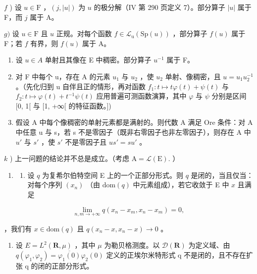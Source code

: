 \(f\) ) 设 \(u\in \mathrm{F}\) ，\((j,|u|)\) 为 \(u\) 的极分解（IV 第 290 页定义 7）。部分算子 \(|u|\) 属于 F，而 \(j\) 属于 A。

\(g)\) 设 \(u \in \mathrm{F}\) 且 \(u\) 正规。对每个函数 \(f \in \mathcal{L}_{\mathrm{u}}(\mathrm{Sp}(u))\) ，部分算子 \(f(u)\) 属于 F；若 \(f\) 有界，则 \(f(u)\) 属于 A。

\begin{enumerate}
\def\labelenumi{\alph{enumi})}
\setcounter{enumi}{7}
\item
  设 \(u \in A\) 单射且其像在 E 中稠密。部分算子 \(u^{-1}\) 属于 F。
\item
  对 F 中每个 u，存在 A 的元素 \(u_{1}\) 与 \(u_{2}\) ，使 \(u_{2}\) 单射、像稠密，且 \(u = u_{1}u_{2}^{-1}\) 。（先化归到 u 自伴且正的情形，再对函数 \(f_{1}: t \mapsto t\varphi(t) + \psi(t)\) 与 \(f_{2}: t \mapsto \varphi(t) + t^{-1}\psi(t)\) 应用普遍可测函数演算，其中 \(\varphi\) 与 \(\psi\) 分别是区间 {[}0, 1{[} 与 {[}1, +∞{[} 的特征函数。{]})
\item
  假设 A 中每个像稠密的单射元素都是满射的。则代数 A 满足 Ore 条件：对 A 中任意 u 与 s，若 s 不是零因子（既非右零因子也非左零因子），则存在 A 中 \(u'\) 与 \(s'\) ，使 \(s'\) 不是零因子且 \(us' = su'\) 。
\end{enumerate}

\(k\) ) 上一问题的结论并不总是成立。（考虑 \(\mathrm{A} = \mathcal{L}(\mathrm{E}).\) ）

\begin{enumerate}
\def\labelenumi{\arabic{enumi})}
\setcounter{enumi}{10}
\tightlist
\item
  \begin{enumerate}
  \def\labelenumii{\alph{enumii})}
  \tightlist
  \item
    设 \(q\) 为复希尔伯特空间 E 上的一个正部分形式。则 \(q\) 是闭的，当且仅当：对每个序列 \((x_{n})\) （由 \(\text{dom}(q)\) 中元素组成），若它收敛于 E 中 \(x\) 且满足
  \end{enumerate}
\end{enumerate}

\[
\lim _ {n, m \to + \infty} q (x _ {n} - x _ {m}, x _ {n} - x _ {m}) = 0,
\]

，我们有 \(x \in \text{dom}(q)\) 且 \(q(x_{n} - x, x_{n} - x) \to 0\) 。

\begin{enumerate}
\def\labelenumi{\alph{enumi})}
\setcounter{enumi}{1}
\tightlist
\item
  设 \(E = L^{2}(\mathbf{R}, \mu)\) ，其中 \(\mu\) 为勒贝格测度。以 \(\mathcal{D}(\mathbf{R})\) 为定义域、由 \(q(\varphi_{1}, \varphi_{2}) = \overline{\varphi_{1}(0)}\varphi_{2}(0)\) 定义的正埃尔米特形式 q 不是闭的，且不存在扩张 q 的闭的正部分形式。
\end{enumerate}

